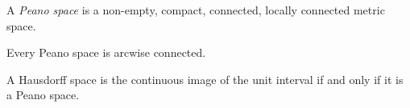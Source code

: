 \documentclass[12pt]{article}
\begin{document}
A {\it Peano space} is a non-empty, compact, connected, locally connected metric space.

Every Peano space is arcwise connected. 

A Hausdorff space is the continuous image of the unit interval if and only if
it is a Peano space.

\end{document}
